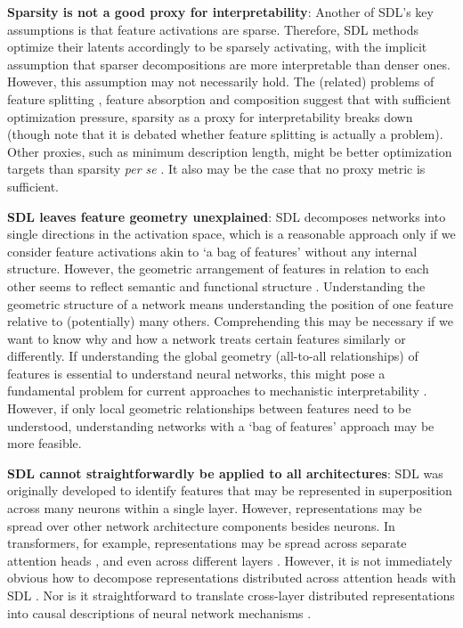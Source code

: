 \textbf{Sparsity is not a good proxy for interpretability}: Another of SDL's key assumptions is that feature activations are sparse. Therefore, SDL methods optimize their latents accordingly to be sparsely activating, with the implicit assumption that sparser decompositions are more interpretable than denser ones. However, this assumption may not necessarily hold. The (related) problems of feature splitting \citep{Bricken_2023_dictionary}, feature absorption \citep{chanin2024absorptionstudyingfeaturesplitting} and composition \citep{till2024sparse} suggest that with sufficient optimization pressure, sparsity as a proxy for interpretability breaks down (though note that it is debated whether feature splitting is actually a problem). Other proxies, such as minimum description length, might be better optimization targets than sparsity \textit{per se} \citep{ayonrinde2024interpretabilitycompressionreconsideringsae}. It also may be the case that no proxy metric is sufficient.

\textbf{SDL leaves feature geometry unexplained}: SDL decomposes networks into single directions in the activation space, which is a reasonable approach only if we consider feature activations akin to `a bag of features' \citep{Harris_1954_distributionalstructure} without any internal structure. However, the geometric arrangement of features in relation to each other seems to reflect semantic and functional structure \citep{engels2024languagemodelfeatureslinear,gurnee2024languagemodelsrepresentspace, park2024geometrycategoricalhierarchicalconcepts,bussman2024metasaes}. Understanding the geometric structure of a network means understanding the position of one feature relative to (potentially) many others. Comprehending this may be necessary if we want to know why and how a network treats certain features similarly or differently. If understanding the global geometry (all-to-all relationships) of features is essential to understand neural networks, this might pose a fundamental problem for current approaches to mechanistic interpretability \citep{hani2024mathematicalmodels, mendel2024sae}. However, if only local geometric relationships between features need to be understood, understanding networks with a `bag of features' approach may be more feasible.

\textbf{SDL cannot straightforwardly be applied to all architectures}: SDL was originally developed to identify features that may be represented in superposition across many neurons within a single layer. However, representations may be spread over other network architecture components besides neurons. In transformers, for example, representations may be spread across separate attention heads \citep{jermyn2023attention, janiak2023polysemantic}, and even across different layers \citep{yun2023transformervisualizationdictionarylearning, lindsey2024crosscoders}. However, it is not immediately obvious how to decompose representations distributed across attention heads with SDL \citep{mathwin2024gated, wynroe2024decomposing}. Nor is it straightforward to translate cross-layer distributed representations into causal descriptions of neural network mechanisms \citep{lindsey2024crosscoders}.


